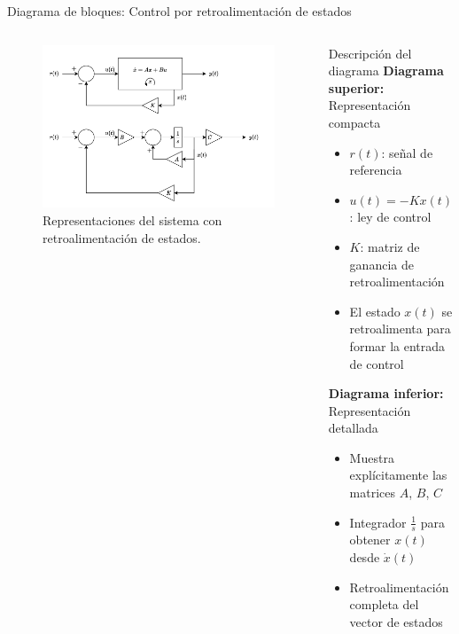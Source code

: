 \documentclass[
    10pt,
    aspectratio=169,
    xcolor={dvipsnames},
    spanish,
    ]{beamer}
\begin{document}
\begin{frame}{Diagrama de bloques: Control por retroalimentación de estados}
\footnotesize
\begin{columns}
  \begin{column}{0.58\textwidth}
    \begin{figure}
      \centering
      \includegraphics[width=\textwidth]{Figura_5.png}
      \caption{Representaciones del sistema con retroalimentación de estados.}
    \end{figure}
  \end{column}
  \begin{column}{0.40\textwidth}
    \begin{block}{Descripción del diagrama}
      \textbf{Diagrama superior:} Representación compacta
      \begin{itemize}\itemsep1pt
        \item $r(t)$: señal de referencia
        \item $u(t) = -Kx(t) + r(t)$: ley de control
        \item $K$: matriz de ganancia de retroalimentación
        \item El estado $x(t)$ se retroalimenta para formar la entrada de control
      \end{itemize}
      
      \textbf{Diagrama inferior:} Representación detallada
      \begin{itemize}\itemsep1pt
        \item Muestra explícitamente las matrices $A$, $B$, $C$
        \item Integrador $\frac{1}{s}$ para obtener $x(t)$ desde $\dot{x}(t)$
        \item Retroalimentación completa del vector de estados
      \end{itemize}
    \end{block}
  \end{column}
\end{columns}
\end{frame}
\end{document}

